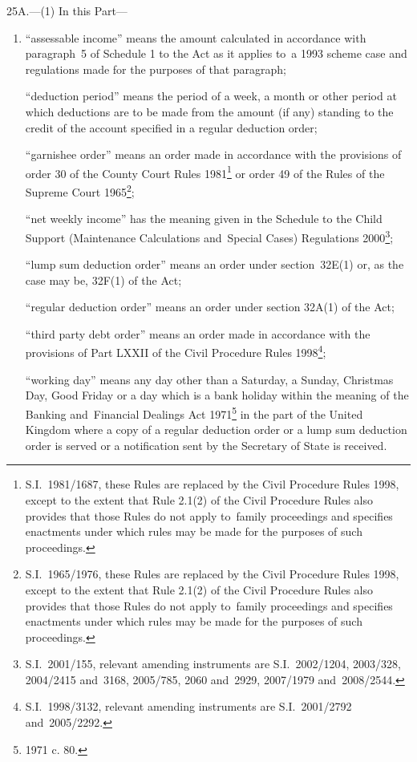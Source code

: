 \documentclass[12pt,a4paper]{article}
\begin{document}
25A.---(1)  In this Part—
\begin{enumerate}\item[]
“assessable income” means the amount calculated in accordance with paragraph~5 of Schedule 1 to the Act as it applies to~a 1993 scheme case and regulations made for the purposes of that paragraph;

“deduction period” means the period of a week, a month or other period at which deductions are to be made from the amount (if any) standing to the credit of the account specified in a regular deduction order;

“garnishee order” means an order made in accordance with the provisions of order 30 of the County Court Rules 1981\footnote{S.I.~1981/1687, these Rules are replaced by the Civil Procedure Rules 1998, except to the extent that Rule 2.1(2) of the Civil Procedure Rules also provides that those Rules do not apply to~family proceedings and specifies enactments under which rules may be made for the purposes of such proceedings.} or order 49 of the Rules of the Supreme Court 1965\footnote{S.I.~1965/1976, these Rules are replaced by the Civil Procedure Rules 1998, except to the extent that Rule 2.1(2) of the Civil Procedure Rules also provides that those Rules do not apply to~family proceedings and specifies enactments under which rules may be made for the purposes of such proceedings.};

“net weekly income” has the meaning given in the Schedule to the Child Support (Maintenance Calculations and~Special Cases) Regulations 2000\footnote{S.I.~2001/155, relevant amending instruments are S.I.~2002/1204, 2003/328, 2004/2415 and~3168, 2005/785, 2060 and~2929, 2007/1979 and~2008/2544.};

“lump sum deduction order” means an order under section~32E(1) or, as the case may be, 32F(1) of the Act;

“regular deduction order” means an order under section 32A(1) of the Act;

“third party debt order” means an order made in accordance with the provisions of Part LXXII of the Civil Procedure Rules 1998\footnote{S.I.~1998/3132, relevant amending instruments are S.I.~2001/2792 and~2005/2292.};

“working day” means any day other than a Saturday, a Sunday, Christmas Day, Good Friday or a day which is a bank holiday within the meaning of the Banking and~Financial Dealings Act 1971\footnote{1971 c. 80.} in the part of the United Kingdom where a copy of a regular deduction order or a lump sum deduction order is served or a notification sent by the %
Secretary of State  %
is received.
\end{enumerate}
\end{document}
